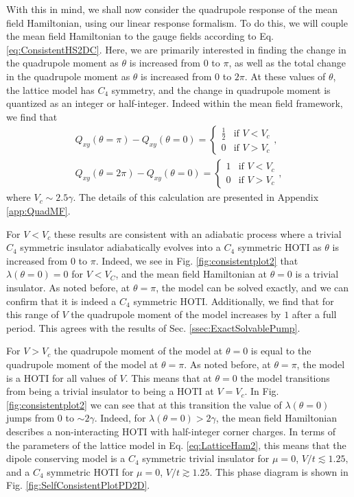 \documentclass[prb,aps,twocolumn,groupaddress,floatfix]{revtex4-1}
\begin{document}
With this in mind, we shall now consider the quadrupole response of the mean field Hamiltonian, using our linear response formalism. To do this, we will couple the mean field Hamiltonian to the gauge fields according to Eq. \ref{eq:ConsistentHS2DC}. Here, we are primarily interested in finding the change in the quadrupole moment as $\theta$ is increased from $0$ to $\pi$, as well as the total change in the quadrupole moment as $\theta$ is increased from $0$ to $2\pi$. At these values of $\theta$, the lattice model has $C_4$ symmetry, and the change in quadrupole moment is quantized as an integer or half-integer. Indeed within the mean field framework, we find that
\begin{equation}\begin{split}
Q_{xy}(\theta = \pi) - Q_{xy}(\theta = 0) = \begin{cases} \frac{1}{2} &\mbox{if }  V < V_c \\
0 & \mbox{if }  V > V_c \end{cases},\\
Q_{xy}(\theta = 2\pi) - Q_{xy}(\theta = 0) = \begin{cases} 1 &\mbox{if }  V < V_c \\
0 & \mbox{if } V > V_c \end{cases},
\label{eq:MeanFieldQuadResult}\end{split}
\end{equation}
where $V_c \sim 2.5 \gamma$. The details of this calculation are presented in Appendix \ref{app:QuadMF}. 

For $V<V_c$ these results are consistent with an adiabatic process where a trivial $C_4$ symmetric insulator adiabatically evolves into a $C_4$ symmetric HOTI as $\theta$ is increased from $0$ to $\pi$. Indeed, we see in Fig. \ref{fig:consistentplot2} that $\lambda(\theta = 0) = 0$ for $V<V_C$, and the mean field Hamiltonian at $\theta = 0$ is a trivial insulator. As noted before, at $\theta = \pi$, the model can be solved exactly, and we can confirm that it is indeed a $C_4$ symmetric HOTI. Additionally, we find that for this range of $V$ the quadrupole moment of the model increases by $1$ after a full period. This agrees with the results of Sec. \ref{ssec:ExactSolvablePump}. 

For $V > V_c$ the quadrupole moment of the model at $\theta = 0$ is equal to the quadrupole moment of the model at $\theta = \pi$. As noted before, at $\theta = \pi$, the model is a HOTI for all values of $V$. This means that at $\theta = 0$ the model transitions from being a trivial insulator to being a HOTI at $ V = V_c$. In Fig. \ref{fig:consistentplot2} we can see that at this transition the value of $\lambda(\theta = 0)$ jumps from $0$ to $\sim 2\gamma$. Indeed, for $\lambda(\theta = 0) > 2\gamma$, the mean field Hamiltonian describes a non-interacting HOTI with half-integer corner charges\cite{benalcazar2017a}. In terms of the parameters of the lattice model in Eq. \ref{eq:LatticeHam2}, this means that the dipole conserving model is a $C_4$ symmetric trivial insulator for $\mu = 0$, $V/t \lesssim 1.25,$ and a $C_4$ symmetric HOTI for $\mu = 0$, $V/t \gtrsim 1.25$. This phase diagram is shown in Fig. \ref{fig:SelfConsistentPlotPD2D}. 
\end{document}

